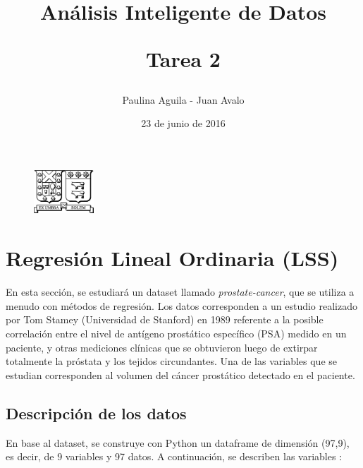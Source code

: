 \documentclass[letter, 10pt]{article}
\begin{document}
\title{Análisis Inteligente de Datos \\ \begin{Large}Tarea 2\end{Large}}
\author{Paulina Aguila - Juan Avalo}
\date{23 de junio de 2016}

\maketitle


\begin{figure}[ht]
\begin{center}
\includegraphics[width=0.2\textwidth]{Images/Isotipo-Negro.png}\\
\end{center}
\end{figure}
\vspace{2cm}

\section{Regresión Lineal Ordinaria (LSS)}

En esta sección, se estudiará un dataset llamado \textit{prostate-cancer}\cite{D}, que se utiliza a menudo con métodos de regresión. Los datos corresponden a un estudio realizado por Tom Stamey (Universidad de Stanford) en 1989 referente a la posible correlación entre el nivel de antígeno prostático específico (PSA) medido en un paciente, y otras mediciones clínicas que se obtuvieron luego de extirpar totalmente la próstata y los tejidos circundantes. Una de las variables que se estudian corresponden al volumen del cáncer prostático detectado en el paciente.

\subsection{Descripción de los datos}
En base al dataset, se construye con Python un dataframe de dimensión (97,9), es decir, de 9 variables y 97 datos. A continuación, se describen las variables \cite{DD}:
\end{document}
